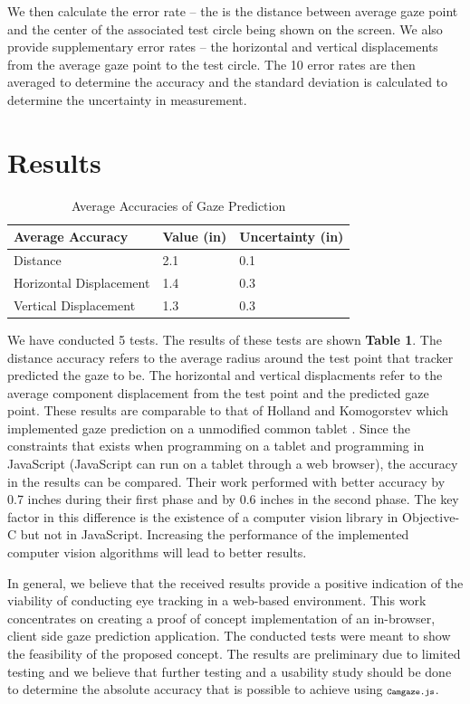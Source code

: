 \documentclass[annual]{acmsiggraph}
\newcommand{\Acronym}[1]{\ensuremath{{\small{\texttt{#1}}}}}
\newcommand{\Name}{\Acronym{Camgaze.js}} \newcommand{\False}{\Constant{false}}
\newcommand{\Constant}[1]{\ensuremath{\small{\texttt{#1}}}}
\begin{document}
We then calculate the error rate -- the is the distance between average gaze
point and the center of the associated test circle being shown on the screen.
We also provide supplementary error rates -- the horizontal and vertical
displacements from the average gaze point to the test circle. The 10 error
rates are then averaged to determine the accuracy and the standard deviation is
calculated to determine the uncertainty in measurement.

\section{Results}

\begin{table} \caption{Average Accuracies of Gaze Prediction}
\begin{tabular}{l|l|l} \textbf{Average Accuracy} & \textbf{Value} (in) &
\textbf{Uncertainty} (in) \\ \hline Distance & 2.1 & 0.1 \\ Horizontal
Displacement      & 1.4 & 0.3 \\ Vertical Displacement& 1.3 & 0.3 \\
\end{tabular} \end{table}

We have conducted 5 tests. The results of these tests are shown \textbf{Table
1}. The distance accuracy refers to the average radius around the test point
that tracker predicted the gaze to be. The horizontal and vertical displacments
refer to the average component displacement from the test point and the
predicted gaze point. These results are comparable to that of Holland and
Komogorstev which implemented gaze prediction on a unmodified common tablet
\cite{holland2012eye}. Since the constraints that exists when programming on a
tablet and programming in JavaScript (JavaScript can run on a tablet through a
web browser), the accuracy in the results can be compared. Their work performed
with better accuracy by 0.7 inches during their first phase and by 0.6 inches
in the second phase. The key factor in this difference is the existence of a
computer vision library in Objective-C but not in JavaScript. Increasing the
performance of the implemented computer vision algorithms will lead to better
results. 

In general, we believe that the received results provide a positive indication
of the viability of conducting eye tracking in a web-based environment. This
work concentrates on creating a proof of concept implementation of an
in-browser, client side gaze prediction application. The conducted tests were
meant to show the feasibility of the proposed concept. The results are
preliminary due to limited testing and we believe that further testing and a
usability study should be done to determine the absolute accuracy that is
possible to achieve using $\Name$.
\end{document}
